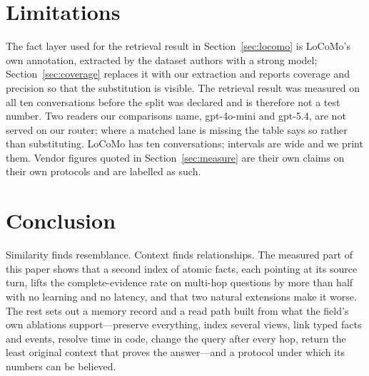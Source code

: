 \documentclass[11pt]{article}
\begin{document}
\section{Limitations}

The fact layer used for the retrieval result in Section~\ref{sec:locomo} is
LoCoMo's own annotation, extracted by the dataset authors with a strong
model; Section~\ref{sec:coverage} replaces it with our extraction and
reports coverage and precision so that the substitution is visible. The
retrieval result was measured on all ten conversations before the split
was declared and is therefore not a test number. Two readers our
comparisons name, gpt-4o-mini and gpt-5.4, are not served on our router;
where a matched lane is missing the table says so rather than substituting.
LoCoMo has ten conversations; intervals are wide and we print them.
Vendor figures quoted in Section~\ref{sec:measure} are their own claims on
their own protocols and are labelled as such.

\section{Conclusion}

Similarity finds resemblance. Context finds relationships. The measured
part of this paper shows that a second index of atomic facts, each pointing
at its source turn, lifts the complete-evidence rate on multi-hop questions
by more than half with no learning and no latency, and that two natural
extensions make it worse. The rest sets out a memory record and a read path
built from what the field's own ablations support---preserve everything,
index several views, link typed facts and events, resolve time in code,
change the query after every hop, return the least original context that
proves the answer---and a protocol under which its numbers can be believed.
\end{document}
